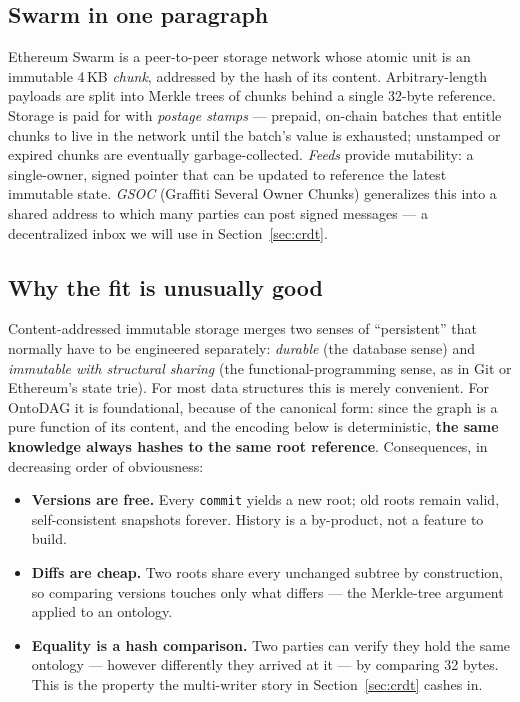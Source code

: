 \documentclass[10pt,twocolumn]{article}
\begin{document}
\subsection{Swarm in one paragraph}
Ethereum Swarm \cite{tron2020} is a peer-to-peer storage network whose
atomic unit is an immutable 4\,KB \emph{chunk}, addressed by the hash of
its content. Arbitrary-length payloads are split into Merkle trees of
chunks behind a single 32-byte reference. Storage is paid for with
\emph{postage stamps} --- prepaid, on-chain batches that entitle chunks to
live in the network until the batch's value is exhausted; unstamped or
expired chunks are eventually garbage-collected. \emph{Feeds} provide
mutability: a single-owner, signed pointer that can be updated to
reference the latest immutable state. \emph{GSOC} (Graffiti Several
Owner Chunks) generalizes this into a shared address to which many
parties can post signed messages --- a decentralized inbox we will use in
Section~\ref{sec:crdt}.

\subsection{Why the fit is unusually good}
Content-addressed immutable storage merges two senses of ``persistent''
that normally have to be engineered separately: \emph{durable} (the
database sense) and \emph{immutable with structural sharing} (the
functional-programming sense, as in Git or Ethereum's state trie). For
most data structures this is merely convenient. For OntoDAG it is
foundational, because of the canonical form: since the graph is a pure
function of its content, and the encoding below is deterministic,
\textbf{the same knowledge always hashes to the same root reference}.
Consequences, in decreasing order of obviousness:

\begin{itemize}
  \item \textbf{Versions are free.} Every \texttt{commit} yields a new
  root; old roots remain valid, self-consistent snapshots forever. History
  is a by-product, not a feature to build.
  \item \textbf{Diffs are cheap.} Two roots share every unchanged subtree
  by construction, so comparing versions touches only what differs ---
  the Merkle-tree argument \cite{merkle1987} applied to an ontology.
  \item \textbf{Equality is a hash comparison.} Two parties can verify
  they hold the same ontology --- however differently they arrived at it
  --- by comparing 32 bytes. This is the property the multi-writer story
  in Section~\ref{sec:crdt} cashes in.
\end{itemize}
\end{document}
